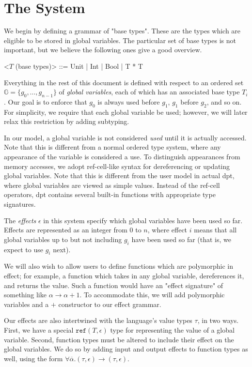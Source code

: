 \documentclass{article}
\begin{document}
	\section*{The System}
	We begin by defining a grammar of "base types". These are the types which are eligible to be stored in global variables. The particular set of base types is not important, but we believe the following ones give a good overview.
	
	\begin{grammar}
		<$T$ (base types)> ::= Unit | Int | Bool | T * T
	\end{grammar}
	
	Everything in the rest of this document is defined with respect to an ordered set $\mathbb{G} = \{g_0, \dots, g_{n-1}\}$ of \emph{global variables}, each of which has an associated base type $T_i$. Our goal is to enforce that $g_0$ is always used before $g_1$, $g_1$ before $g_2$, and so on. For simplicity, we require that each global variable be used; however, we will later relax this restriction by adding subtyping.
	
	In our model, a global variable is not considered \emph{used} until it is actually accessed. Note that this is different from a normal ordered type system, where any appearance of the variable is considered a use. To distinguish appearances from memory accesses, we adopt ref-cell-like syntax for dereferencing or updating global variables. Note that this is different from the user model in actual dpt, where global variables are viewed as simple values. Instead of the ref-cell operators, dpt contains several built-in functions with appropriate type signatures.
	
	The \emph{effects} $\epsilon$ in this system specify which global variables have been used so far. Effects are represented as an integer from $0$ to $n$, where effect $i$ means that all global variables up to but not including $g_i$ have been used so far (that is, we expect to use $g_i$ next).
	
	We will also wish to allow users to define functions which are polymorphic in effect; for example, a function which takes in any global variable, dereferences it, and returns the value. Such a function would have an "effect signature" of something like $\alpha \rightarrow \alpha + 1$. To accommodate this, we will add polymorphic variables and a $+$ constructor to our effect grammar.
	
	Our effects are also intertwined with the language's value types $\tau$, in two ways. First, we have a special $\texttt{ref} (T, \epsilon)$ type for representing the value of a global variable. Second, function types must be altered to include their effect on the global variables. We do so by adding input and output effects to function types as well, using the form $\forall \overline \alpha. (\tau, \epsilon) \rightarrow (\tau, \epsilon)$.
	
\end{document}
